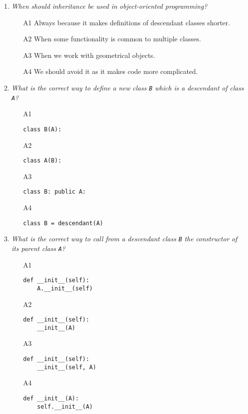 \begin{enumerate}

\item {\em When should inheritance be used in object-oriented programming?}\\

\begin{enumerate}
\item[A1] Always because it makes definitions of descendant classes shorter.
\item[A2] When some functionality is common to multiple classes.
\item[A3] When we work with geometrical objects. 
\item[A4] We should avoid it as it makes code more complicated.
\end{enumerate}

\vspace{6mm}

\item {\em What is the correct way to define a new class {\tt B} which is a descendant of 
      class {\tt A}?}\\

\begin{enumerate}
\item[A1] 
\begin{verbatim}
class B(A):
\end{verbatim}
\item[A2] 
\begin{verbatim}
class A(B):
\end{verbatim}
\item[A3] 
\begin{verbatim}
class B: public A:
\end{verbatim}
\item[A4] 
\begin{verbatim}
class B = descendant(A)
\end{verbatim}
\end{enumerate}

\vspace{6mm}

\item {\em What is the correct way to call from a descendant class {\tt B} the constructor of its parent class 
      {\tt A}?}\\

\begin{enumerate}
\item[A1] 
\begin{verbatim}
def __init__(self):
    A.__init__(self)
\end{verbatim}
\item[A2] 
\begin{verbatim}
def __init__(self):
    __init__(A)
\end{verbatim}
\item[A3] 
\begin{verbatim}
def __init__(self):
    __init__(self, A)
\end{verbatim}
\item[A4] 
\begin{verbatim}
def __init__(A):
    self.__init__(A)
\end{verbatim}
\end{enumerate}

\vspace{6mm}

\end{enumerate}

 
